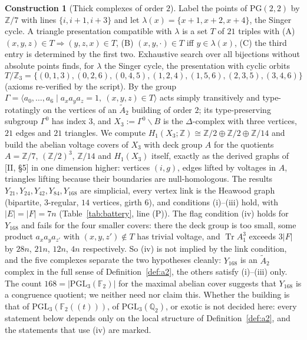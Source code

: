 \documentclass[11pt]{amsart}
\numberwithin{equation}{section}
\theoremstyle{definition}
\newtheorem{construction}[theorem]{Construction}
\theoremstyle{remark}
\newcommand{\Z}{\mathbb{Z}}
\newcommand{\Q}{\mathbb{Q}}
\newcommand{\F}{\mathbb{F}}
\newcommand{\Tr}{\operatorname{Tr}}
\newcommand{\PGL}{\mathrm{PGL}}
\newcommand{\PG}{\mathrm{PG}}
\newcommand{\Atwo}{\widetilde A_2}
\begin{document}
\begin{construction}[Thick complexes of order $2$]\label{con:thick}
Label the points of $\PG(2,2)$ by $\Z/7$ with lines $\{i,i+1,i+3\}$ and let
$\lambda(x)=\{x+1,x+2,x+4\}$, the Singer cycle. A triangle presentation compatible with
$\lambda$ \cite{CMSZ} is a set $T$ of $21$ triples with (A) $(x,y,z)\in T\Rightarrow
(y,z,x)\in T$, (B) $(x,y,\cdot)\in T$ iff $y\in\lambda(x)$, (C) the third entry is
determined by the first two. Exhaustive search over all bijections without absolute points
finds, for $\lambda$ the Singer cycle, the presentation with cyclic orbits
\[
T/\Z_3=\{(0,1,3),(0,2,6),(0,4,5),(1,2,4),(1,5,6),(2,3,5),(3,4,6)\}
\]
(axioms re-verified by the script). By \cite{CMSZ} the group
$\Gamma=\langle a_0,\dots,a_6\mid a_xa_ya_z=1,\ (x,y,z)\in T\rangle$ acts simply
transitively and type-rotatingly on the vertices of an $\Atwo$ building of order $2$; its
type-preserving subgroup $\Gamma^{0}$ has index $3$, and $X_3:=\Gamma^{0}\backslash B$ is
the $\Delta$-complex with three vertices, $21$ edges and $21$ triangles. We compute
$H_1(X_3;\Z)\cong\Z/2\oplus\Z/2\oplus\Z/14$ and build the abelian voltage covers of $X_3$
with deck group $A$ for the quotients $A=\Z/7$, $(\Z/2)^{3}$, $\Z/14$ and $H_1(X_3)$
itself, exactly as the derived graphs of [II, \S5] in one dimension higher: vertices
$(i,g)$, edges lifted by voltages in $A$, triangles lifting because their boundaries are
null-homologous. The results $Y_{21},Y_{24},Y_{42},Y_{84},Y_{168}$ are simplicial, every
vertex link is the Heawood graph (bipartite, $3$-regular, $14$ vertices, girth $6$), and
conditions (i)--(iii) hold, with $|E|=|F|=7n$ (Table~\ref{tab:battery}, line (P)). The flag
condition (iv) holds for $Y_{168}$ and fails for the four smaller covers: there the deck
group is too small, some product $a_xa_ya_{z'}$ with $(x,y,z')\notin T$ has trivial voltage,
and $\Tr A_1^{3}$ exceeds $3|F|$ by $28n$, $21n$, $12n$, $4n$ respectively. So (iv) is not
implied by the link condition, and the five complexes separate the two hypotheses cleanly:
$Y_{168}$ is an $\Atwo$ complex in the full sense of Definition~\ref{def:a2}, the others
satisfy (i)--(iii) only. The count $168=|\PGL_3(\F_2)|$ for the maximal abelian cover
suggests that $Y_{168}$ is a congruence quotient; we neither need nor claim this. Whether the
building is that of $\PGL_3(\F_2((t)))$, of $\PGL_3(\Q_2)$, or exotic is not decided here:
every statement below depends only on the local structure of Definition~\ref{def:a2}, and
the statements that use (iv) are marked.
\end{construction}
\end{document}
